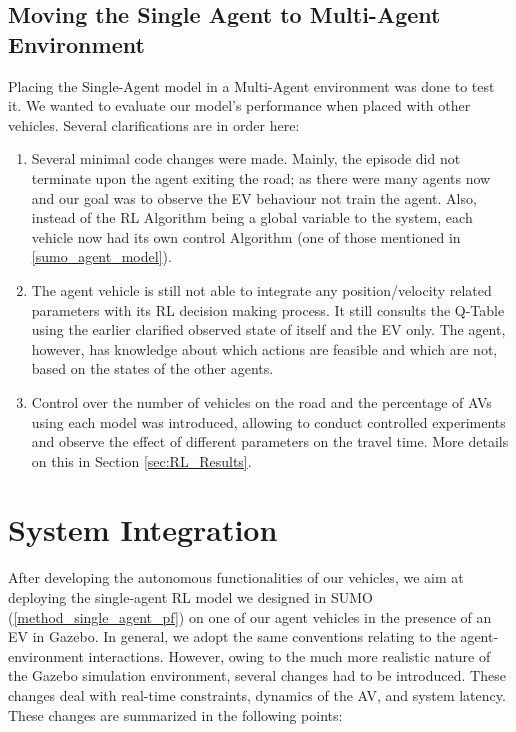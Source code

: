 \subsection{Moving the Single Agent to Multi-Agent Environment}
Placing the Single-Agent model in a Multi-Agent environment was done to test it. We wanted to evaluate our model's performance when placed with other vehicles. Several clarifications are in order here:
\begin{enumerate}
    \item Several minimal code changes were made. Mainly, the episode did not terminate upon the agent exiting the road; as there were many agents now and our goal was to observe the EV behaviour not train the agent. Also, instead of the RL Algorithm being a global variable to the system, each vehicle now had its own control Algorithm (one of those mentioned in \ref{sumo_agent_model}).
    
    \item The agent vehicle is still not able to integrate any position/velocity related parameters with its RL decision making process. It still consults the Q-Table using the earlier clarified observed state of itself and the EV only. The agent, however, has knowledge about which actions are feasible and which are not, based on the states of the other agents.
    
    \item Control over the number of vehicles on the road and the percentage of AVs using each model was introduced, allowing to conduct controlled experiments and observe the effect of different parameters on the travel time. More details on this in Section \ref{sec:RL_Results}.
\end{enumerate}

\section{System Integration}
\label{method_integr}
After developing the autonomous functionalities of our vehicles, we aim at deploying the single-agent RL model we designed in SUMO (\ref{method_single_agent_pf}) on one of our agent vehicles in the presence of an EV in Gazebo. In general, we adopt the same conventions relating to the agent-environment interactions. However, owing to the much more realistic nature of the Gazebo simulation environment, several changes had to be introduced. These changes deal with real-time constraints, dynamics of the AV, and system latency. These changes are summarized in the following points:

